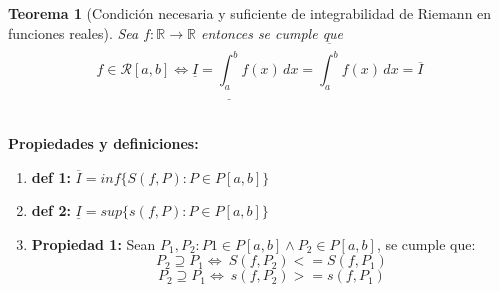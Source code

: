 \documentclass{article}
\title{}
\author{
Ailema Matos C121,
Raúl R. Espinosa C122 
}
\newtheorem{theorem}{Teorema}
\begin{document}
\maketitle

\begin{theorem}[Condición necesaria y suficiente de integrabilidad de Riemann en funciones reales]
Sea \( f: \mathbb{R} \to \mathbb{R} \) entonces se cumple que \[f \in \mathcal{R}[a, b] \Longleftrightarrow \underline{I} = \underline{\int_a^b} f(x) \, dx = \overline{\int_a^b} f(x) \, dx = \overline{I}\]\\
\end{theorem}

\textbf{Propiedades y definiciones:}

\begin{enumerate}
   \item \textbf{def 1:}  \(\overline{I} = inf \{ S(f, P): P \in P[a, b] \} \)  
    \item \textbf{def 2:}  \(\underline{I} = sup\{ s(f, P): P \in P[a, b] \} \)
    \item \textbf{Propiedad 1:} Sean \(P_1, P_2:  P1 \in P[a, b] \wedge P_2 \in P[a,b] \), se cumple que:
    \[
    P_2 \supseteq P_1  \Longleftrightarrow\ S(f, P_2) <= S(f, P_1)
    \]
    \[
    P_2 \supseteq P_1\Longleftrightarrow\ s(f, P_2) >= s(f, P_1)
    \]
\end{enumerate} 
\end{document}

